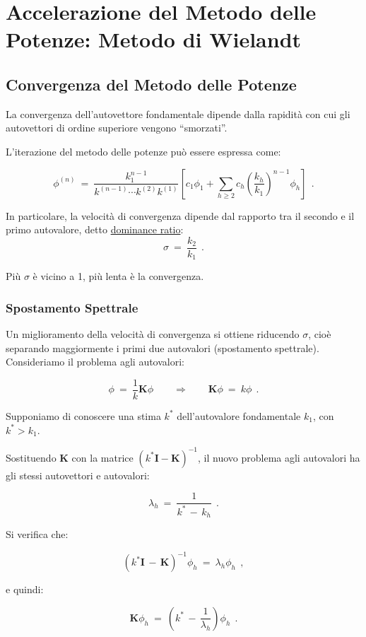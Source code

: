 \chapter{Accelerazione del Metodo delle Potenze: Metodo di Wielandt}

\section{Convergenza del Metodo delle Potenze}
La convergenza dell'autovettore fondamentale dipende dalla rapidità con cui gli autovettori di ordine superiore vengono ``smorzati''. 

L'iterazione del metodo delle potenze può essere espressa come:  

\[\phi^{(n)}\ =\ \frac{k_1^{n-1}}{k^{(n-1)} \cdots k^{(2)} k^{(1)}} \left[ c_1 \phi_1 + \sum_{h \geq 2} c_h \left(\frac{k_h}{k_1}\right)^{n-1} \phi_h \right]\ \ .\]
  
In particolare, la velocità di convergenza dipende dal rapporto tra il secondo e il primo autovalore, detto \underline{dominance ratio}:  
\[\sigma\ =\ \frac{k_2}{k_1}\ \ .\]  

Più $\sigma$ è vicino a 1, più lenta è la convergenza.

%
%
\subsection{Spostamento Spettrale}
Un miglioramento della velocità di convergenza si ottiene riducendo $\sigma$, cioè separando maggiormente i primi due autovalori (spostamento spettrale). Consideriamo il problema agli autovalori: 

\[\phi\ =\ \frac{1}{k} \mathbf{K} \phi \qquad \Rightarrow \qquad \mathbf{K} \phi\ =\ k \phi\ \ .\]
  
Supponiamo di conoscere una stima $k^*$ dell'autovalore fondamentale $k_1$, con $k^* > k_1$. 

Sostituendo $\mathbf{K}$ con la matrice $(k^*\mathbf{I} - \mathbf{K})^{-1}$, il nuovo problema agli autovalori ha gli stessi autovettori e autovalori:  

\[\lambda_h\ =\ \frac{1}{k^*\, -\, k_h}\ \ .\]  

Si verifica che:  

\[(k^*\mathbf{I}\, -\, \mathbf{K})^{-1} \phi_h\ =\ \lambda_h \phi_h\ \ ,\]  

e quindi:  

\[\mathbf{K} \phi_h\ =\ \left(k^*\, -\, \frac{1}{\lambda_h}\right) \phi_h\ \ .\]

